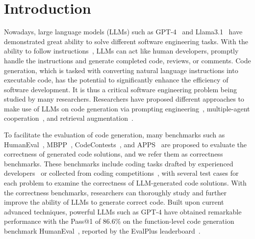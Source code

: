 \section{Introduction}\label{sec:intro}

Nowadays, large language models (LLMs) such as GPT-4~\cite{gpt4} and Llama3.1~\cite{llama31} have demonstrated great ability to solve different software engineering tasks. With the ability to follow instructions~\cite{chung22scaling,wei22emergent,ouyang22training,Muennighoff24octopack}, LLMs can act like human developers, promptly handle the instructions and generate completed code, reviews, or comments. Code generation, which is tasked with
converting natural language instructions into executable code, 
has the potential to significantly enhance the efficiency of software development.
It is thus a critical software engineering problem being studied by many researchers. Researchers have proposed different approaches to make use of LLMs on code generation via prompting engineering~\cite{shinn23reflexion,zhou23language,chen23teaching,ni23lever,ridnik24code}, multiple-agent cooperation~\cite{huang23agentcoder,hong24metagpt,wang24executable,zhang24autocoderover,yang24sweagent,holt23l2mac}, and retrieval augmentation~\cite{liu21retrieval,parvez21retrieval,zhou23docpromting,zhang23repocoder,su24arks}. 

To facilitate the evaluation of code generation, many benchmarks such as HumanEval~\cite{humaneval}, MBPP~\cite{mbpp}, CodeContests~\cite{codecontests}, and APPS~\cite{apps} are proposed to evaluate the correctness of generated code solutions, and we refer them as correctness benchmarks. These benchmarks include coding tasks drafted by experienced developers~\cite{humaneval,mbpp} or collected from coding competitions~\cite{codecontests,apps}, with several test cases for each problem to examine the correctness of LLM-generated code solutions. With the correctness benchmarks, researchers can thoroughly study and further improve the ability of LLMs to generate correct code. Built upon current advanced techniques, powerful LLMs such as GPT-4 have obtained remarkable performance with the Pass@1 of 86.6\% on the function-level code generation benchmark HumanEval~\cite{humaneval}, reported by the EvalPlus leaderboard~\cite{evalplusboard}.


